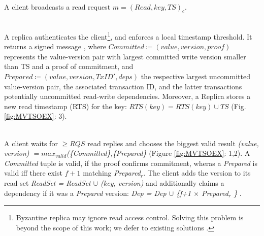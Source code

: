 \\
A client broadcasts a read request  $m = (Read, key, TS)_c$.

{}

\\
A replica authenticates the client\footnote{Byzantine replica may ignore read access control. Solving this problem is beyond the scope of this work; we defer to existing solutions \cite{basu2019efficient}.}, and enforces a local timestamp threshold.  It returns a signed message , where $Committed \coloneqq (value, version, proof)$ represents the value-version pair with largest committed write version smaller than TS and a proof of commitment,  and $Prepared \coloneqq (value, version, TxID', deps)$ the respective largest uncommitted value-version pair, the associated transaction ID, and the latter transactions potentially uncommitted read-write dependencies. Moreover, a Replica stores a new read timestamp (RTS) for the key: $RTS(key) = RTS(key) \cup TS$ (Fig. \ref{fig:MVTSOEX}: 3). 

\\
A client waits for $\geq RQS$ read replies and chooses the biggest valid result \textit{(value, version) $= max_{valid}$(\{Committed\},\{Prepared\}} (Figure \ref{fig:MVTSOEX}: 1,2). A \textit{Committed} tuple is valid, if the proof confirms commitment, wheras a \textit{Prepared} is valid iff there exist $f+1$ matching \textit{Prepared$_r$}. The client adds the version to its read set \textit{ReadSet = ReadSet $\cup$ (key, version)} and additionally claims a dependency if it was a \textit{Prepared} version: \textit{Dep = Dep $\cup$ \{f+1 $\times$ Prepared$_r$ \}} . 

